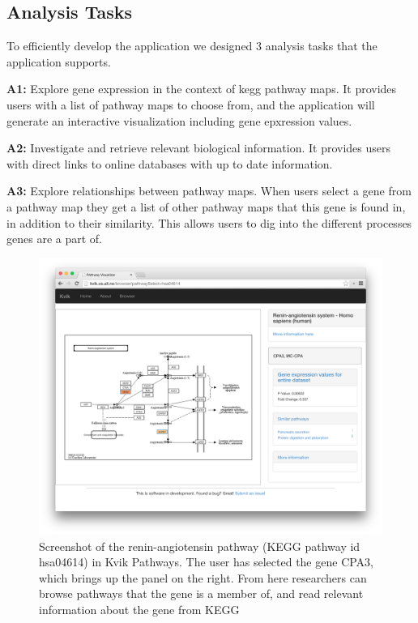\subsection{Analysis Tasks} 
To efficiently develop the application we designed 3 analysis tasks that the
application supports. 

\textbf{A1:} Explore gene expression in the context of \gls{kegg} pathway maps.
It provides users with a list of pathway maps to choose from, and the
application will generate an interactive visualization including gene epxression
values. 

\textbf{A2:} Investigate and retrieve relevant biological information. It
provides users with direct links to online databases with up to date
information. 

\textbf{A3:} Explore relationships between pathway maps. When users select a
gene from a pathway map they get a list of other pathway maps that this
gene is found in, in addition to their similarity. This allows users to dig into
the different processes genes are a part of. 

\begin{figure}[htb!]
    \begin{centering}
    \includegraphics[width=\textwidth]{figures/kvikpwfig.png}
    \caption{Screenshot of the renin-angiotensin pathway (KEGG pathway id
    hsa04614) in Kvik Pathways. The user has selected the gene CPA3, which brings 
    up the panel on the right. From here researchers can browse pathways that the
    gene is a member of, and read relevant information about the gene from KEGG} 
    \label{kvikpwfig}
    \end{centering} 
\end{figure}



